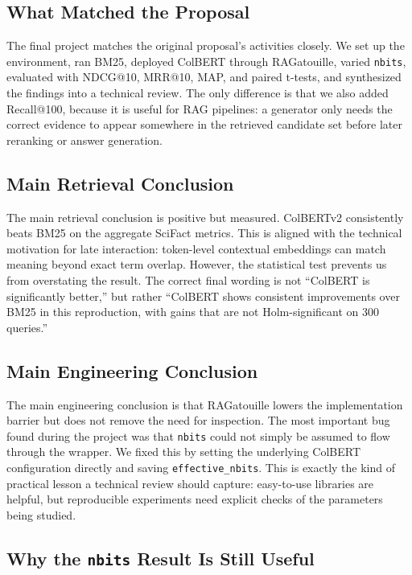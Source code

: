 \documentclass[sigconf,nonacm]{acmart}
\begin{document}
\subsection{What Matched the Proposal}

The final project matches the original proposal's activities closely. We set up
the environment, ran BM25, deployed ColBERT through RAGatouille, varied
\texttt{nbits}, evaluated with NDCG@10, MRR@10, MAP, and paired t-tests, and
synthesized the findings into a technical review. The only difference is that
we also added Recall@100, because it is useful for RAG pipelines: a generator
only needs the correct evidence to appear somewhere in the retrieved candidate
set before later reranking or answer generation.

\subsection{Main Retrieval Conclusion}

The main retrieval conclusion is positive but measured. ColBERTv2 consistently
beats BM25 on the aggregate SciFact metrics. This is aligned with the technical
motivation for late interaction: token-level contextual embeddings can match
meaning beyond exact term overlap. However, the statistical test prevents us
from overstating the result. The correct final wording is not ``ColBERT is
significantly better,'' but rather ``ColBERT shows consistent improvements over
BM25 in this reproduction, with gains that are not Holm-significant on 300
queries.''

\subsection{Main Engineering Conclusion}

The main engineering conclusion is that RAGatouille lowers the implementation
barrier but does not remove the need for inspection. The most important bug
found during the project was that \texttt{nbits} could not simply be assumed to
flow through the wrapper. We fixed this by setting the underlying ColBERT
configuration directly and saving \texttt{effective\_nbits}. This is exactly
the kind of practical lesson a technical review should capture: easy-to-use
libraries are helpful, but reproducible experiments need explicit checks of the
parameters being studied.

\subsection{Why the \texttt{nbits} Result Is Still Useful}
\end{document}
